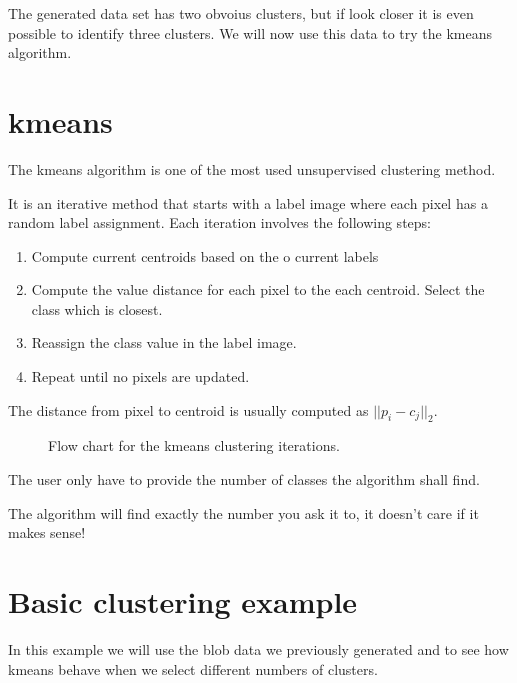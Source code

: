 \documentclass[letterpaper,10pt,english]{sphinxmanual}
\begin{document}
\noindent{}

The generated data set has two obvoius clusters, but if look closer it is even possible to identify three clusters. We will now use this data to try the k\sphinxhyphen{}means algorithm.


\section{k\sphinxhyphen{}means}
\label{\detokenize{ML4NeutronImageSegmentation:k-means}}
The k\sphinxhyphen{}means algorithm is one of the most used unsupervised clustering method.



It is an iterative method that starts with a label image where each pixel has a random label assignment. Each iteration involves the following steps:
\begin{enumerate}
%
\item {} 
Compute current centroids based on the o current labels

\item {} 
Compute the value distance for each pixel to the each centroid. Select the class which is closest.

\item {} 
Reassign the class value in the label image.

\item {} 
Repeat until no pixels are updated.

\end{enumerate}

The distance from pixel  to centroid  is usually computed as \(||p_i - c_j||_2\).

\begin{figure}[htbp]
\centering
\capstart

\noindent{}
\caption{Flow chart for the k\sphinxhyphen{}means clustering iterations.}\label{\detokenize{ML4NeutronImageSegmentation:id15}}\end{figure}

The user only have to provide the number of classes the algorithm shall find.

 The algorithm will find exactly the number you ask it to, it doesn’t care if it makes sense!


\section{Basic clustering example}
\label{\detokenize{ML4NeutronImageSegmentation:basic-clustering-example}}
In this example we will use the blob data we previously generated and to see how k\sphinxhyphen{}means behave when we select different numbers of clusters.
\end{document}
